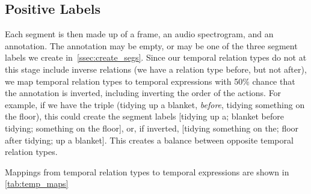 \subsection{Positive Labels}
\label{ssec:pos_labels}

Each segment is then made up of a frame, an audio spectrogram, and an
annotation.  The annotation may be empty, or may be one of the three segment
labels we create in~\cref{ssec:create_segs}. Since our temporal relation types
do not at this stage include inverse relations (we have a relation type before,
but not after), we map temporal relation types to temporal expressions with
50\% chance that the annotation is inverted, including inverting the order of
the actions. For example, if we have the triple (tidying up a blanket, \textit{before},
tidying something on the floor), this could create the segment labels [tidying
up a; blanket before tidying; something on the floor], or, if inverted,
[tidying something on the; floor after tidying; up a blanket]. This creates a
balance between opposite temporal relation types.

Mappings from temporal relation types to temporal expressions are shown in
\cref{tab:temp_maps}

